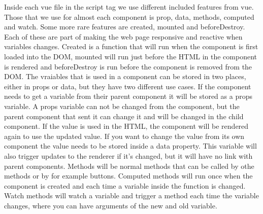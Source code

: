 Inside each vue file in the script tag we use different included features from vue. Those that we use for almost each component is prop, data, methods, computed and watch. Some more rare features are created, mounted and beforeDestroy. Each of these are part of making the web page responsive and reactive when variables changes. Created is a function that will run when the component is first loaded into the DOM, mounted will run just before the HTML in the component is rendered and beforeDestroy is run before the component is removed from the DOM. The vraiables that is used in a component can be stored in two places, either in props or data, but they have two different use cases. If the component needs to get a variable from their parent component it will be stored as a props variable. A props variable can not be changed from the component, but the parent component that sent it can change it and will be changed in the child component. If the value is used in the HTML, the component will be rendered again to use the updated value. If you want to change the value from its own component the value needs to be stored inside a data property. This variable will also trigger updates to the renderer if it's changed, but it will have no link with parent components. Methods will be normal methods that can be called by othe methods or by for example buttons. Computed methods will run once when the component is created and each time a variable inside the function is changed. Watch methods will watch a variable and trigger a method each time the variable changes, where you can have arguments of the new and old variable.
